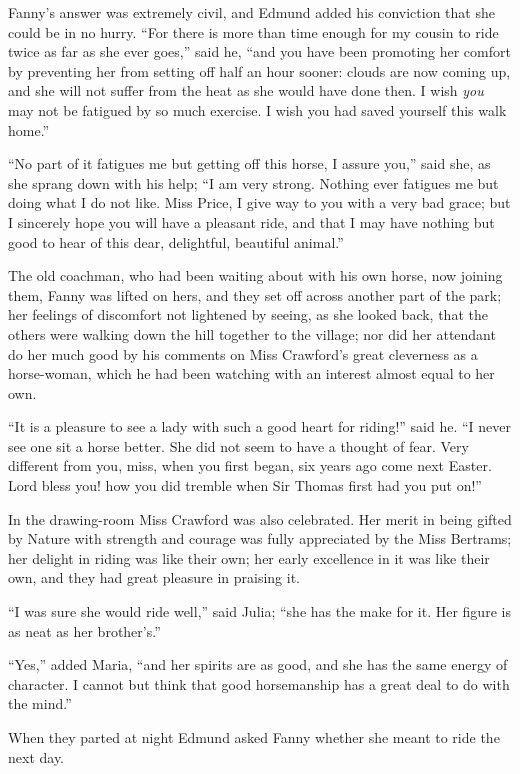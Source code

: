 Fanny's answer was extremely civil, and Edmund added
his conviction that she could be in no hurry.  ``For there
is more than time enough for my cousin to ride twice
as far as she ever goes,'' said he, ``and you have been
promoting her comfort by preventing her from setting off
half an hour sooner:  clouds are now coming up, and she
will not suffer from the heat as she would have done then.
I wish \emph{you} may not be fatigued by so much exercise.
I wish you had saved yourself this walk home.''

``No part of it fatigues me but getting off this horse,
I assure you,'' said she, as she sprang down with his help;
``I am very strong.  Nothing ever fatigues me but doing
what I do not like.  Miss Price, I give way to you with
a very bad grace; but I sincerely hope you will have
a pleasant ride, and that I may have nothing but good
to hear of this dear, delightful, beautiful animal.''

The old coachman, who had been waiting about with his
own horse, now joining them, Fanny was lifted on hers,
and they set off across another part of the park;
her feelings of discomfort not lightened by seeing,
as she looked back, that the others were walking down
the hill together to the village; nor did her attendant
do her much good by his comments on Miss Crawford's great
cleverness as a horse-woman, which he had been watching
with an interest almost equal to her own.

``It is a pleasure to see a lady with such a good heart
for riding!'' said he.  ``I never see one sit a horse better.
She did not seem to have a thought of fear.  Very different
from you, miss, when you first began, six years ago come
next Easter.  Lord bless you! how you did tremble when Sir
Thomas first had you put on!''

In the drawing-room Miss Crawford was also celebrated.
Her merit in being gifted by Nature with strength
and courage was fully appreciated by the Miss Bertrams;
her delight in riding was like their own; her early
excellence in it was like their own, and they had great
pleasure in praising it.

``I was sure she would ride well,'' said Julia; ``she has
the make for it.  Her figure is as neat as her brother's.''

``Yes,'' added Maria, ``and her spirits are as good, and she
has the same energy of character.  I cannot but think
that good horsemanship has a great deal to do with the mind.''

When they parted at night Edmund asked Fanny whether she
meant to ride the next day.

